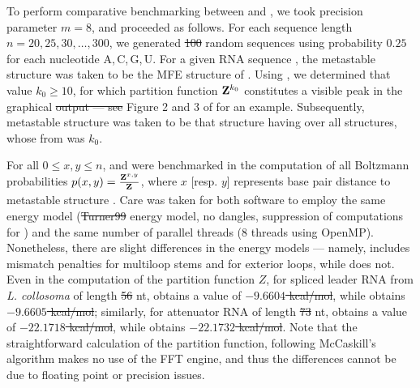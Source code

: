 \documentclass[11pt, oneside]{Thesis} %
\providecommand{\DIFadd}[1]{{\protect\color{blue}\uwave{#1}}} %
\providecommand{\DIFdel}[1]{{\protect\color{red}\sout{#1}}}                      %
\providecommand{\DIFaddbegin}{} %
\providecommand{\DIFaddend}{} %
\providecommand{\DIFdelbegin}{} %
\providecommand{\DIFdelend}{} %
\begin{document}
To perform comparative benchmarking between \rnatwofold and \ffttwo,
we took precision parameter $m=8$, and proceeded as follows.
For each sequence length $n = 20,25,30,\ldots,300$, we generated
\DIFdelbegin \DIFdel{100 }\DIFdelend \DIFaddbegin \DIFadd{$100$ }\DIFaddend random sequences using probability $0.25$ for each nucleotide
A,\,C,\,G,\,U.
For a given RNA sequence \seq, the metastable structure \strA was
taken to be the MFE structure of \seq.
Using \rnabor, we determined that value $k_0 \geq 10$, for which
partition function ${\bf Z}^{k_0}_{}$ constitutes a visible peak in the graphical
\DIFdelbegin \DIFdel{output --- see }\DIFdelend \DIFaddbegin \DIFadd{output---see }\DIFaddend Figure 2 and 3 of \citep{freyhult.b07} for an example.
Subsequently, metastable structure \strB was taken to be that structure
having \mfe over all structures, whose \bpd from
\strA was $k_0$.

For all $0 \leq x,y \leq n$, \rnatwofold and \ffttwo were
benchmarked in the computation of all Boltzmann probabilities
$p(x,y)= \frac{{\bf Z}^{x,y}_{}}{{\bf Z}^{}_{}}$, where $x$ [resp. $y$] represents base pair
distance to metastable structure . Care was taken for
both software to employ the same energy model (\DIFdelbegin \DIFdel{Turner99 }\DIFdelend \DIFaddbegin \DIFadd{Turner$99$ }\DIFaddend energy model,
no dangles, suppression of \mfes computations
for \rnatwofold) and the same number of parallel threads (8 threads
using OpenMP). Nonetheless, there are slight differences in the energy
models --- namely, \rnatwofold includes
mismatch penalties for multiloop stems and for exterior loops, while
\ffttwo does not. Even in the computation of the partition function
$Z$, for spliced leader RNA from {\em L. collosoma} of length \DIFdelbegin \DIFdel{56 }\DIFdelend \DIFaddbegin \DIFadd{$56$ }\DIFaddend nt,
\rnatwofold {} obtains a value of
\DIFdelbegin \DIFdel{$-9.6604$ kcal/mol}\DIFdelend \DIFaddbegin {}\DIFaddend , while \ffttwo obtains
\DIFdelbegin \DIFdel{$-9.6605$ kcal/mol}\DIFdelend \DIFaddbegin {}\DIFaddend ; similarly, for attenuator RNA of length \DIFdelbegin \DIFdel{73 }\DIFdelend \DIFaddbegin \DIFadd{$73$ }\DIFaddend nt,
\rnatwofold {} obtains a value of
\DIFdelbegin \DIFdel{$-22.1718$ kcal/mol}\DIFdelend \DIFaddbegin {}\DIFaddend , while \ffttwo obtains
\DIFdelbegin \DIFdel{$-22.1732$ kcal/mol}\DIFdelend \DIFaddbegin {}\DIFaddend .
Note that the straightforward calculation of the partition function, following McCaskill's algorithm \citep{mccaskill} makes no use of the FFT engine, and thus the differences cannot be due to floating point or precision issues.
\end{document}
